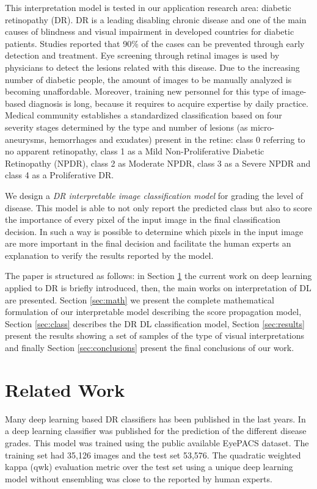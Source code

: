 \documentclass[preprint]{elsarticle}
\theoremstyle{definition} %
\theoremstyle{remark}
\begin{document}
This interpretation model is tested in our application research area: diabetic retinopathy (DR). DR is a leading disabling chronic disease  and  one of the main causes of blindness and visual impairment in developed countries for diabetic patients. Studies reported that 90\% of the cases can be prevented through early detection and treatment. Eye screening through retinal images is used by physicians to detect the lesions related with this disease. Due to the increasing number of diabetic people, the amount of images to be manually analyzed is becoming unaffordable. Moreover, training new personnel for this type of image-based diagnosis is long, because it requires to acquire expertise by daily practice. Medical community establishes a standardized classification based on four severity stages \cite{diaclass} determined by the type and number of lesions (as micro-aneurysms, hemorrhages and exudates) present in the retine: class 0 referring to no apparent retinopathy, class 1 as a Mild Non-Proliferative Diabetic Retinopathy (NPDR), class 2 as Moderate NPDR, class 3 as a Severe NPDR and class 4 as a Proliferative DR. 

We design a \emph{DR interpretable image classification model} for grading the level of disease. This model is able to not only report the predicted class but also to score the importance of every pixel of the input image in the final classification decision. In such a way is possible to determine which pixels in the input image are more important in the final decision and facilitate the human experts an explanation to verify the results reported by the model.

The paper is structured as follows: in Section \ref{sec:related} the current work on deep learning applied to DR is briefly introduced, then, the main works on interpretation of DL are presented. Section \ref{sec:math} we present the complete mathematical formulation of our interpretable model describing the score propagation model, Section \ref{sec:class} describes the DR DL classification model, Section \ref{sec:results} present the results showing a set of samples of the type of visual interpretations and finally Section \ref{sec:conclusions} present the final conclusions of our work.

\section{Related Work}\label{sec:related}

Many deep learning based DR classifiers has been published in the last years. In \citep{DELATORRE2017} a deep learning classifier was published for the prediction of the different disease grades. This model was trained using the public available EyePACS dataset. The training set had 35,126 images and the test set 53,576. The quadratic weighted kappa (qwk) evaluation metric \citep{cohen1968weighted} over the test set using a unique deep learning model without ensembling was close to the reported by human experts. 
\end{document}
